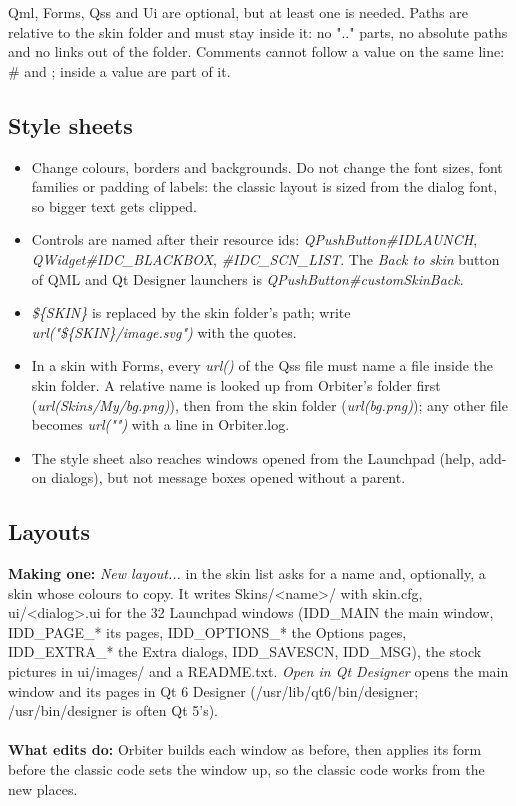 \documentclass[Orbiter Developer Manual.tex]{subfiles}
\begin{document}
\begin{sloppypar}
\noindent
Qml, Forms, Qss and Ui are optional, but at least one is needed. Paths are relative to the skin folder and must stay inside it: no ".." parts, no absolute paths and no links out of the folder. Comments cannot follow a value on the same line: \# and ; inside a value are part of it.


\subsection{Style sheets}
\begin{itemize}
\item Change colours, borders and backgrounds. Do not change the font sizes, font families or padding of labels: the classic layout is sized from the dialog font, so bigger text gets clipped.
\item Controls are named after their resource ids: \textit{QPushButton\#IDLAUNCH}, \textit{QWidget\#IDC\_BLACKBOX}, \textit{\#IDC\_SCN\_LIST}. The \textit{Back to skin} button of QML and Qt Designer launchers is \textit{QPushButton\#customSkinBack}.
\item \textit{\$\{SKIN\}} is replaced by the skin folder's path; write \textit{url("\$\{SKIN\}/image.svg")} with the quotes.
\item In a skin with Forms, every \textit{url()} of the Qss file must name a file inside the skin folder. A relative name is looked up from Orbiter's folder first (\textit{url(Skins/My/bg.png)}), then from the skin folder (\textit{url(bg.png)}); any other file becomes \textit{url("")} with a line in Orbiter.log.
\item The style sheet also reaches windows opened from the Launchpad (help, add-on dialogs), but not message boxes opened without a parent.
\end{itemize}


\subsection{Layouts}
\textbf{Making one:} \textit{New layout...} in the skin list asks for a name and, optionally, a skin whose colours to copy. It writes Skins/<name>/ with skin.cfg, ui/<dialog>.ui for the 32 Launchpad windows (IDD\_MAIN the main window, IDD\_PAGE\_* its pages, IDD\_OPTIONS\_* the Options pages, IDD\_EXTRA\_* the Extra dialogs, IDD\_SAVESCN, IDD\_MSG), the stock pictures in ui/images/ and a README.txt. \textit{Open in Qt Designer} opens the main window and its pages in Qt 6 Designer (/usr/lib/qt6/bin/designer; /usr/bin/designer is often Qt 5's).\\
\\
\textbf{What edits do:} Orbiter builds each window as before, then applies its form before the classic code sets the window up, so the classic code works from the new places.


\end{sloppypar}
\end{document}
